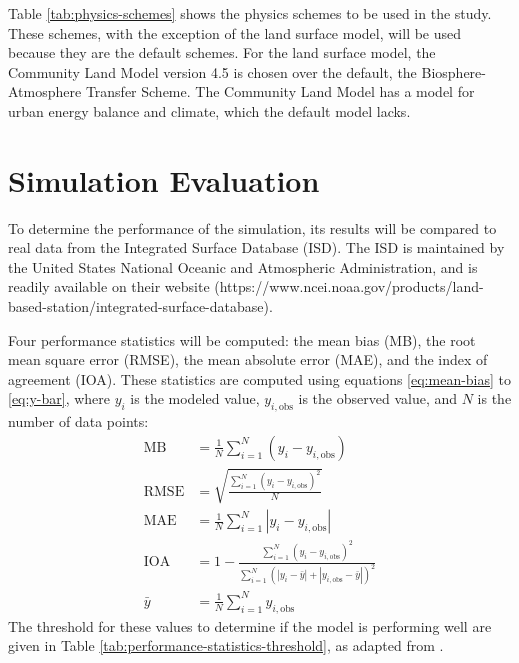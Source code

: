	Table \ref{tab:physics-schemes} shows the physics schemes to be used in the study.
	These schemes, with the exception of the land surface model, will be used because they are the default schemes. 
	For the land surface model, the Community Land Model version 4.5 is chosen over the default, the Biosphere-Atmosphere Transfer Scheme. 
	The Community Land Model has a model for urban energy balance and climate, which the default model lacks.
	
	
	
\section{Simulation Evaluation}
	To determine the performance of the simulation, its results will be compared to real data from the Integrated Surface Database (ISD).
	The ISD is maintained by the United States National Oceanic and Atmospheric Administration, and is readily available on their website 
		(https://www.ncei.noaa.gov/products/land-based-station/integrated-surface-database).
	
	Four performance statistics will be computed: 
		the mean bias (MB),
		the root mean square error (RMSE),
		the mean absolute error (MAE), and
		the index of agreement (IOA).
	These statistics are computed using equations \ref{eq:mean-bias} to \ref{eq:y-bar},
		where $y_i$ is the modeled value, $y_{i,\text{obs}}$ is the observed value, and $N$ is the number of data points:
	\begin{align}
		\text{MB} &=
			\frac{1}{N}
			\sum_{i=1}^{N}
			(y_i - y_{i,\text{obs}})
			\label{eq:mean-bias}
		\\
		\text{RMSE} &=
			\sqrt{
				\frac{
					\sum_{i=1}^{N}
					(y_i - y_{i,\text{obs}}) ^ 2
				}{N}
			}
			\label{eq:root-mean-square-error}
		\\
		\text{MAE} &=
			\frac{1}{N}
			\sum_{i=1}^{N} 
			|y_i - y_{i,\text{obs}}| \label{eq:mean-absolute-error}
		\\
		\text{IOA} &=
			1 - 
			\frac{
				\sum_{i=1}^{N}
				(y_i - y_{i,\text{obs}}) ^ 2
			}{
				\sum_{i=1}^{N} (
					|y_i - \bar{y}| +
					|y_{i,\text{obs}} - \bar{y}|
				)^2
			}
			\label{eq:index-of-agreement}
		\\
		\bar{y} &= 
			\frac{1}{N}
			\sum_{i=1}^{N} y_{i,\text{obs}}
			\label{eq:y-bar}
	\end{align}
	The threshold for these values to determine if the model is performing well are given in Table \ref{tab:performance-statistics-threshold}, as adapted from \textcite{Bilang2022}.

